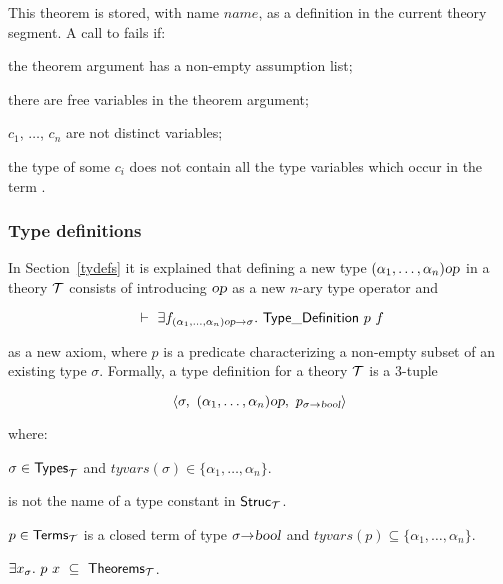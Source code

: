 \noindent This theorem is stored,
with name $name$, as a definition in the current theory segment. A call to
 fails if:

\begin{myenumerate}
\item the theorem argument has a non-empty assumption list;
\item there are free variables in the theorem argument;
\item $c_1$, $\dots$, $c_n$ are not distinct variables;
\item the type of some $c_i$ does not contain all the type
variables which occur in the term
.
\end{myenumerate}

\subsubsection{Type definitions}
\label{type-defs}

In Section~\ref{tydefs} it is explained that
defining
a new type $(\alpha_1,\ldots,\alpha_n)\textsl{op}$ in a theory ${\cal T}$ consists
of introducing $\textsl{op}$ as a new $n$-ary type operator and

\[\turn \equant{f_{(\alpha_1,\ldots,\alpha_n)\ty{op}\fun\sigma}}\TyDef\ p\ f\]

\noindent as a new axiom, where $p$ is a predicate
characterizing a
non-empty subset of an existing type $\sigma$.  Formally, a type definition
for a theory ${\cal T}$ is a $3$-tuple

\[ \langle \sigma,\ (\alpha_1,\ldots,\alpha_n)\ty{op},
    \ p_{\sigma\fun\ty{bool}}\rangle \]

\noindent where:

\begin{myenumerate}
\item $\sigma\in{\sf Types}_{\cal T}$  and
$tyvars(\sigma)\in\{\alpha_1, \ldots , \alpha_n\}$.
\item {} is not the name of a type constant in ${\sf Struc}_{\cal T}$.
\item $p\in{\sf Terms}_{\cal T}$ is a closed term of
type $\sigma{\to}\textsl{bool}$  and
$tyvars(p)\subseteq\{\alpha_1, \ldots , \alpha_n\}$.
\item $\exists x_{\sigma}.\ p\ x \ \subseteq\ {\sf Theorems}_{\cal T}$.
\end{myenumerate}

